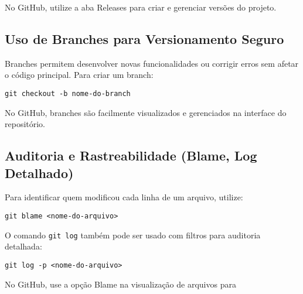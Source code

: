 No GitHub, utilize a aba Releases para criar e gerenciar versões do projeto.

\subsection{Uso de Branches para Versionamento Seguro}

Branches permitem desenvolver novas funcionalidades ou corrigir erros sem afetar o código principal. Para criar um branch:

\begin{lstlisting}[style=shellstyle]
git checkout -b nome-do-branch
\end{lstlisting}

No GitHub, branches são facilmente visualizados e gerenciados na interface do repositório.

\subsection{Auditoria e Rastreabilidade (Blame, Log Detalhado)}

Para identificar quem modificou cada linha de um arquivo, utilize:

\begin{lstlisting}[style=shellstyle]
git blame <nome-do-arquivo>
\end{lstlisting}

O comando \texttt{git log} também pode ser usado com filtros para auditoria detalhada:

\begin{lstlisting}[style=shellstyle]
git log -p <nome-do-arquivo>
\end{lstlisting}

No GitHub, use a opção Blame na visualização de arquivos para